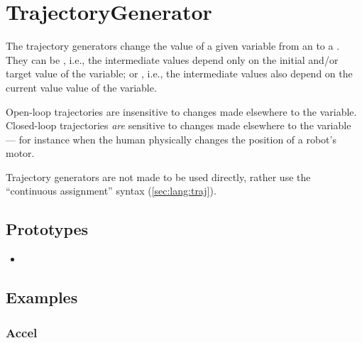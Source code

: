 \section{TrajectoryGenerator}

The trajectory generators change the value of a given variable from an
 to a .  They can be , i.e., the intermediate values depend only on the initial
and/or target value of the variable; or , i.e., the
intermediate values also depend on the current value value of the
variable.

Open-loop trajectories are insensitive to changes made elsewhere to
the variable.  Closed-loop trajectories \emph{are} sensitive to
changes made elsewhere to the variable --- for instance when the human
physically changes the position of a robot's motor.

Trajectory generators are not made to be used directly, rather use the
``continuous assignment'' syntax (\autoref{sec:lang:traj}).


\subsection{Prototypes}
\begin{itemize}
\item {}
\end{itemize}

\subsection{Examples}
\label{sec:traj:examples}

\let\subsubsectionOrig\subsubsection
\renewcommand{\subsubsection}[1]
{%
  \subsubsectionOrig{\label{sec:traj:#1}#1}%
  \index{#1@\lstinline{#1}}%
}

\subsubsection{Accel}

